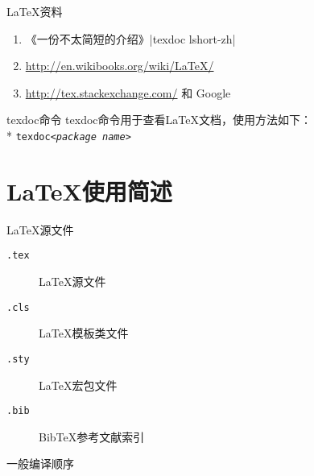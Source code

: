\documentclass[langauge=chinese]{hustbeamer}
\begin{document}
\begin{frame}{\secname}{\textrm{\LaTeX}资料}
\begin{enumerate}
    \item 《一份不太简短的\textrm{\LaTeXe}介绍》|texdoc lshort-zh|
    \item \url{http://en.wikibooks.org/wiki/LaTeX/}
    \item \url{http://tex.stackexchange.com/} 和 Google
\end{enumerate}
\pause
\begin{block}{texdoc命令}
    texdoc命令用于查看\textrm{\LaTeX}文档，使用方法如下：\\*
    \hspace{.8em}\texttt{texdoc\hspace{.8em}\emph{<package name>}}
\end{block}
\end{frame}

\section{\LaTeX{}使用简述}

\begin{frame}{\secname}{\textrm{\LaTeX}源文件}
\begin{description}
    \item[\texttt{.tex}] \textrm{\LaTeX}源文件
    \item[\texttt{.cls}] \textrm{\LaTeX}模板类文件
    \item[\texttt{.sty}] \textrm{\LaTeX}宏包文件
    \item[\texttt{.bib}] \textrm{Bib\TeX}参考文献索引
\end{description}
\end{frame}

\begin{frame}{\secname}{一般编译顺序}
 \\
 \\
 \\
 \\
 \\
 \\
\end{frame}
\end{document}
